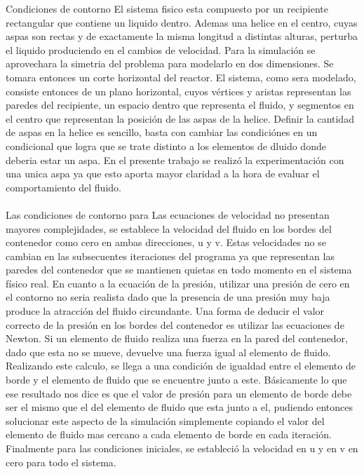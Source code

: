 

\begin{section}{Condiciones de contorno}
El sistema fisico esta compuesto por un recipiente rectangular que contiene un liquido dentro. Ademas una helice en el centro, cuyas aspas son rectas y de exactamente la misma longitud a distintas alturas, perturba el liquido produciendo en el cambios de velocidad. 
Para la simulación se aprovechara la simetria del problema para modelarlo en dos dimensiones. Se tomara entonces un corte horizontal del reactor. El sistema, como sera modelado, consiste entonces de un plano horizontal, cuyos vértices y aristas representan las paredes del recipiente, un espacio dentro que representa el fluido, y segmentos en el centro que representan la posición de las aspas de la helice. Definir la cantidad de aspas en la helice es sencillo, basta con cambiar las condiciónes en un condicional que logra que se trate distinto a los elementos de dluido donde deberia estar un aspa. En el presente trabajo se realizó la experimentación con una unica aspa ya que esto aporta mayor claridad a la hora de evaluar el comportamiento del fluido.
~\\
~\\
Las condiciones de contorno para Las ecuaciones de velocidad no presentan mayores complejidades, se establece la velocidad del fluido en los bordes del contenedor como cero en ambas direcciones, u y v. Estas velocidades no se cambian en las subsecuentes iteraciones del programa ya que representan las paredes del contenedor que se mantienen quietas en todo momento en el sistema físico real.
En cuanto a la ecuación de la presión, utilizar una presión de cero en el contorno no seria realista dado que la presencia de una  presión muy baja produce la atracción del fluido circundante. Una forma de deducir el valor correcto de la presión en los bordes del contenedor es utilizar las ecuaciones de Newton. Si un elemento de fluido realiza una fuerza en la pared del contenedor, dado que esta no se mueve, devuelve una fuerza igual al elemento de fluido. Realizando este calculo, se llega a una condición de igualdad entre el elemento de borde y el elemento de fluido que se encuentre junto a este. Básicamente lo que ese resultado nos dice es que el valor de presión para un elemento de borde debe ser el mismo que el del elemento de fluido que esta junto a el, pudiendo entonces solucionar este aspecto de la simulación simplemente copiando el valor del elemento de fluido mas cercano a cada elemento de borde en cada iteración.\\
Finalmente para las condiciones iniciales, se estableció la velocidad en u y en v en cero para todo el sistema.

\end{section}
